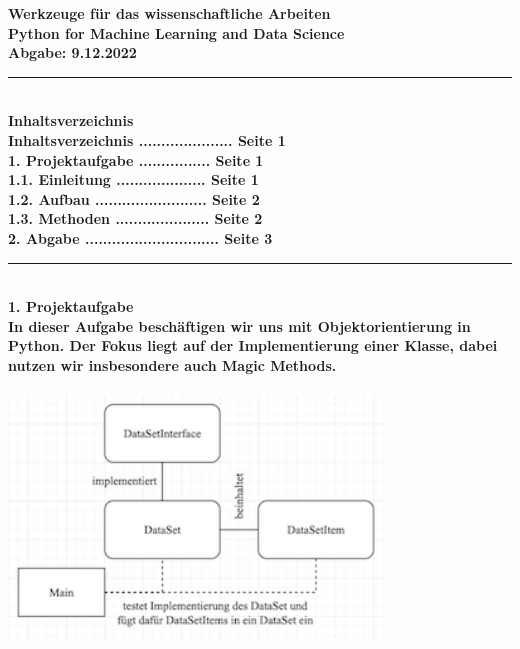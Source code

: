 \documentclass[]{article}
\begin{document}
\bf 
\Large\noindent  Werkzeuge für das wissenschaftliche Arbeiten\\
\normalsize Python for Machine Learning and Data Science\\
\normalfont \hspace*{4.5cm}Abgabe: 9.12.2022\\
\hrule\hfill\\[0.2cm]
\bf \large Inhaltsverzeichnis \normalsize \normalfont\\[0.5cm]
\hspace*{0.5cm} Inhaltsverzeichnis ..................... Seite 1 \\[0.2cm]
\hspace*{0.5cm} \bf 1. Projektaufgabe \normalfont ................ Seite 1 \\
\hspace*{1cm}  1.1. Einleitung .................... Seite 1 \\
\hspace*{1cm}  1.2. Aufbau ......................... Seite 2 \\
\hspace*{1cm}  1.3. Methoden ..................... Seite 2 \\[0.2cm]
\hspace*{0.5cm} \bf 2. Abgabe \normalfont .............................. Seite 3 \\
\hrule\hfill\\[0.2cm]
\bf \large 1. Projektaufgabe \normalsize \normalfont\\[0.5cm]
In dieser Aufgabe beschäftigen wir uns mit Objektorientierung in Python.
Der Fokus liegt auf der Implementierung einer Klasse, dabei nutzen wir insbesondere auch Magic Methods.\\
\\
\hspace*{2cm}\includegraphics[width=10cm]{./../diagram/classes_files.png}\\
\end{document}
